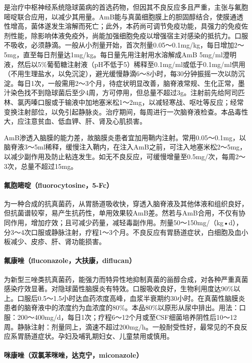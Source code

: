 是治疗中枢神经系统隐球菌病的首选药物，但因其不良反应多且严重，主张与氟胞嘧啶联合应用，以减少其用量。AmB能与真菌细胞膜上的胆固醇结合，使膜通透性增高，菌体遂发生溶解而死亡；此外，本药尚可调节免疫功能，具强力的免疫佐剂性能，除影响体液免疫外，尚能加强细胞免疫以增强宿主对感染的抵抗力。口服不吸收，必须静滴。一般从小剂量开始，首次剂量0.05～0.1mg/kg，每日增加2～5mg，直至每日剂量达1mg/kg。每日量先用注射用水溶解成AmB
5mg/ml澄明液，然后以5\%葡萄糖注射液（pH不低于5）稀释至0.1mg/ml或低于0.1mg/ml供用（不用生理盐水，以免沉淀），避光缓慢静滴6～8小时，每30分钟振摇一次以防沉淀。每日1次，一般需用2～3个月，待症状明显改善，脑脊液常规、生化正常，墨汁染色找不到隐球菌后至少4周，方可停用，但总量不超过3g。注射前先给阿司匹林、氯丙嗪口服或于输液中加地塞米松1～2mg，以减轻寒战、呕吐等反应；经常变换注射部位，以免引起静脉炎。治疗期间，每周进行一次脑脊液检查。本品毒性大，应注意贫血、低血钾、肝、肾及心肌损害。

AmB渗透入脑膜的能力差，故脑膜炎患者宜加用鞘内注射。常用0.05～0.1mg，以脑脊液3～5ml稀释，缓慢注入鞘内，在注入AmB之前，可注入地塞米松2～5mg，以减少副作用及防止粘连发生。如无不良反应，可缓慢增量至0.5mg/次，每周2～3次，总量不超过15mg。

\paragraph{氟胞嘧啶（fluorocytosine，5-Fc）}

为一种合成的抗真菌药，从胃肠道吸收快，穿透入脑脊液及其他体液和组织良好，但抗菌谱较窄，易产生抗药性，单用效果较AmB差。然若与AmB合用，不仅有协同作用，增加疗效；且可减少药量，减轻毒副作用。剂量50～150mg/（kg•d），分3～4次口服或静脉注射，疗程1～3个月。不良反应有胃肠道症状，白细胞及血小板减少、皮疹、肝、肾功能损害。

\paragraph{氟康唑（fluconazole，大扶康，diflucan）}

为新型三唑类抗真菌药，能强力而特异性地抑制真菌的甾醇合成，对各种严重真菌感染疗效显著。对隐球菌性脑膜炎有特效。口服吸收良好，生物利用度达90\%以上。口服后0.5～1.5小时达血药浓度高峰，血浆半衰期约30小时。在真菌性脑膜炎患者的脑脊液中的浓度约为血浓度的80\%。本品80\%以原形从尿中排出。用法：口服：200～400mg/d，每日1次；疗程6～12个月或至CSF细菌培养阴性后10～12周。静脉注射：剂量同上，滴速不超过200mg/h。一般耐受性好，最常见的不良反应系胃肠道症状。孕妇及哺乳期妇女、儿童禁用或慎用。

\paragraph{咪康唑（双氯苯咪唑，达克宁，miconazole）}

